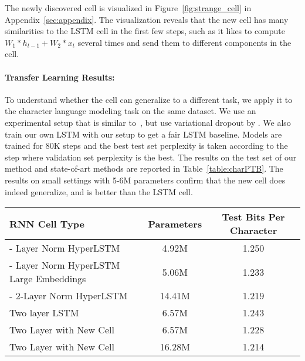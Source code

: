 \documentclass{article} \usepackage{iclr2017_conference,times}
\begin{document}
The newly discovered cell is visualized in Figure~\ref{fig:strange_cell} in Appendix~\ref{sec:appendix}. The visualization reveals that the new cell has many similarities to the LSTM cell in the first few steps, such as it likes to compute $W_1 * h_{t-1} + W_2 * x_t$ several times and send them to different  components in the cell. 


\paragraph{Transfer Learning Results:}
To understand whether the cell can generalize to a different task, we apply it to the character language modeling task on the same dataset. We use an experimental setup that is similar to~\cite{ha2016hypernetworks}, but use variational dropout by \cite{Gal2015}. We also train our own LSTM with our setup to get a fair LSTM baseline. Models are trained for 80K steps and the best test set perplexity is taken according to the step where validation set perplexity is the best. The results on the test set of our method and state-of-art methods are reported in Table~\ref{table:charPTB}. The results on small settings with 5-6M parameters confirm that the new cell does indeed generalize, and is better than the LSTM cell. 

\begin{table*}[h!]
\center
\begin{small}
\begin{tabular}{l|cc}
\toprule
\bf RNN Cell Type & \bf Parameters &  \bf Test Bits Per Character \\
\midrule
\citet{ha2016hypernetworks} - Layer Norm HyperLSTM & 4.92M & 1.250 \\
\citet{ha2016hypernetworks} - Layer Norm HyperLSTM Large Embeddings & 5.06M & 1.233 \\
\citet{ha2016hypernetworks} - 2-Layer Norm HyperLSTM & 14.41M & 1.219 \\
\midrule
Two layer LSTM & 6.57M & 1.243 \\
Two Layer with New Cell & 6.57M & 1.228 \\
Two Layer with New Cell & 16.28M & 1.214\\
\bottomrule
\end{tabular}
\caption{Comparison between our cell and state-of-art methods on PTB character modeling. The new cell was found on word level language modeling.  }
\label{table:charPTB}
\end{small}
\end{table*}
\end{document}

